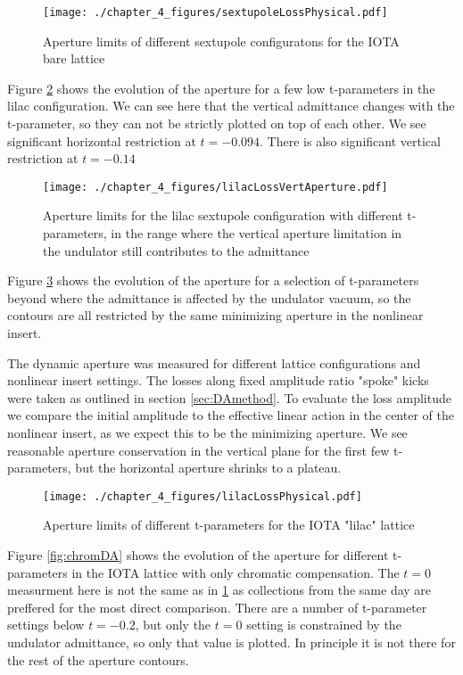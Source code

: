 \begin{figure}
	\centering
	\texttt{[image: ./chapter\_4\_figures/sextupoleLossPhysical.pdf]}
	\caption{Aperture limits of different sextupole configuratons for the IOTA bare lattice}
	\label{fig:bareDA}
\end{figure}


Figure \ref{fig:lowTlilacDA} shows the evolution of the aperture for a few low t-parameters in the lilac configuration. We can see here that the vertical admittance changes with the t-parameter, so they can not be strictly plotted on top of each other. We see significant horizontal restriction at $t=-0.094$. There is also significant vertical restriction at $t=-0.14$

\begin{figure}
	\centering
	\texttt{[image: ./chapter\_4\_figures/lilacLossVertAperture.pdf]}
	\caption{Aperture limits for the lilac sextupole configuration with different t-parameters, in the range where the vertical aperture limitation in the undulator still contributes to the admittance}
	\label{fig:lowTlilacDA}
\end{figure}

Figure \ref{fig:lilacDA} shows the evolution of the aperture for a selection of t-parameters beyond where the admittance is affected by the undulator vacuum, so the contours are all restricted by the same minimizing aperture in the nonlinear insert.


The dynamic aperture was measured for different lattice configurations and nonlinear insert settings. The losses along fixed amplitude ratio "spoke" kicks were taken as outlined in section \ref{sec:DAmethod}. To evaluate the loss amplitude we compare the initial amplitude to the effective linear action in the center of the nonlinear insert, as we expect this to be the minimizing aperture.  We see reasonable aperture conservation in the vertical plane for the first few t-parameters, but the horizontal aperture shrinks to a plateau.

\begin{figure}
	\centering
	\texttt{[image: ./chapter\_4\_figures/lilacLossPhysical.pdf]}
	\caption{Aperture limits of different t-parameters for the IOTA "lilac" lattice}
	\label{fig:lilacDA}
\end{figure}

Figure \ref{fig:chromDA} shows the evolution of the aperture for different t-parameters in the IOTA lattice with only chromatic compensation. The $t=0$ measurment here is not the same as in \ref{fig:bareDA} as collections from the same day are preffered for the most direct comparison. There are a number of t-parameter settings below $t=-0.2$, but only the $t=0$ setting is constrained by the undulator admittance, so only that value is plotted. In principle it is not there for the rest of the aperture contours.

